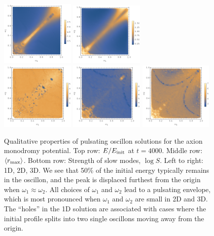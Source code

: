 \documentclass[%
reprint,
superscriptaddress,
amsmath,amssymb,
aps,
prd,
floatfix,
nofootinbib
]{revtex4-1}
\begin{document}
\begin{figure}
    \includegraphics[width=0.32\textwidth]{plot/r_max-axion-2d.png}
    \includegraphics[width=0.32\textwidth]{plot/r_max-axion-3d.png} \\\vskip-5pt
    \includegraphics[width=0.32\textwidth]{plot/slow-mode-logscale-axion-1d.png}
    \includegraphics[width=0.32\textwidth]{plot/slow-mode-logscale-axion-2d.png}
    \includegraphics[width=0.32\textwidth]{plot/slow-mode-logscale-axion-3d.png}
    \caption{Qualitative properties of pulsating oscillon solutions for the axion monodromy potential. Top row: $E/E_{\rm init}$ at $t=4000$.
      Middle row: $\langle r_{\rm max}\rangle$.
      Bottom row: Strength of slow modes, $\log{S}$.\quad
      Left to right: 1D, 2D, 3D. We see that 50\% of the initial energy typically remains in the oscillon, and the peak is displaced furthest from the origin when $\omega_1 \approx \omega_2$. All choices of  $\omega_1$ and $\omega_2$ lead to a pulsating envelope, which is most pronounced when $\omega_1$ and $\omega_2$ are small in 2D and 3D. The ``holes'' in the 1D solution are associated with cases where the initial profile splits into two single oscillons moving away from the origin.}\label{axion-monodromy}
\end{figure}
\end{document}
